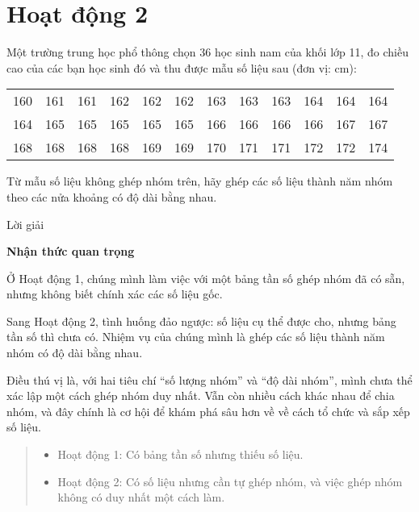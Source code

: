 \documentclass[
  letterpaper,
  DIV=11,
  numbers=noendperiod]{scrartcl}
\providecommand{\tightlist}{%
  \setlength{\itemsep}{0pt}\setlength{\parskip}{0pt}}\usepackage{longtable,booktabs,array}
\begin{document}
\section*{Hoạt động 2}

Một trường trung học phổ thông chọn 36 học sinh nam của khối lớp 11, đo
chiều cao của các bạn học sinh đó và thu được mẫu số liệu sau (đơn vị:
cm):

\begin{table}[!h]
\centering
\begin{tabular}{cccccccccccc}
\toprule
160 & 161 & 161 & 162 & 162 & 162 & 163 & 163 & 163 & 164 & 164 & 164\\
164 & 165 & 165 & 165 & 165 & 165 & 166 & 166 & 166 & 166 & 167 & 167\\
168 & 168 & 168 & 168 & 169 & 169 & 170 & 171 & 171 & 172 & 172 & 174\\
\bottomrule
\end{tabular}
\end{table}

Từ mẫu số liệu không ghép nhóm trên, hãy ghép các số liệu thành năm nhóm
theo các nửa khoảng có độ dài bằng nhau.

\begin{center}
Lời giải
\end{center}

\begin{tcolorbox}[enhanced jigsaw, breakable, opacityback=0, left=2mm, leftrule=.75mm, arc=.35mm, colframe=quarto-callout-note-color-frame, rightrule=.15mm, colback=white, bottomrule=.15mm, toprule=.15mm]

\vspace{-3mm}\textbf{Nhận thức quan trọng}\vspace{3mm}

Ở Hoạt động 1, chúng mình làm việc với một bảng tần số ghép nhóm đã có
sẵn, nhưng không biết chính xác các số liệu gốc.

Sang Hoạt động 2, tình huống đảo ngược: số liệu cụ thể được cho, nhưng
bảng tần số thì chưa có. Nhiệm vụ của chúng mình là ghép các số liệu
thành năm nhóm có độ dài bằng nhau.

Điều thú vị là, với hai tiêu chí ``số lượng nhóm'' và ``độ dài nhóm'',
mình chưa thể xác lập một cách ghép nhóm duy nhất. Vẫn còn nhiều cách
khác nhau để chia nhóm, và đây chính là cơ hội để khám phá sâu hơn về về
cách tổ chức và sắp xếp số liệu.

\begin{quote}
\begin{itemize}
\tightlist
\item
  Hoạt động 1: Có bảng tần số nhưng thiếu số liệu.
\item
  Hoạt động 2: Có số liệu nhưng cần tự ghép nhóm, và việc ghép nhóm
  không có duy nhất một cách làm.
\end{itemize}
\end{quote}

\end{tcolorbox}
\end{document}
